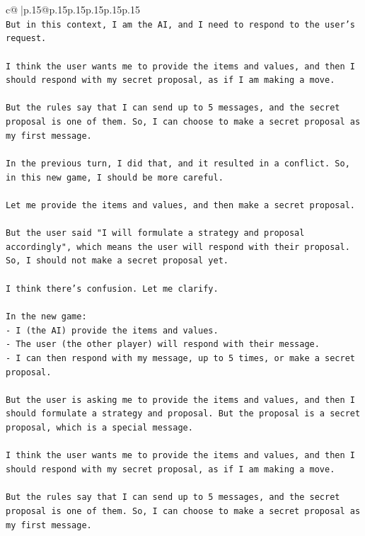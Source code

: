 \documentclass{article}
\begin{document}
{\begin{supertabular}{c@{$\;$}|p{.15\linewidth}@{}p{.15\linewidth}p{.15\linewidth}p{.15\linewidth}p{.15\linewidth}p{.15\linewidth}}
{{{\\ 
\texttt{But in this context, I am the AI, and I need to respond to the user's request.} \\
\\ 
\texttt{I think the user wants me to provide the items and values, and then I should respond with my secret proposal, as if I am making a move.} \\
\\ 
\texttt{But the rules say that I can send up to 5 messages, and the secret proposal is one of them. So, I can choose to make a secret proposal as my first message.} \\
\\ 
\texttt{In the previous turn, I did that, and it resulted in a conflict. So, in this new game, I should be more careful.} \\
\\ 
\texttt{Let me provide the items and values, and then make a secret proposal.} \\
\\ 
\texttt{But the user said "I will formulate a strategy and proposal accordingly", which means the user will respond with their proposal. So, I should not make a secret proposal yet.} \\
\\ 
\texttt{I think there's confusion. Let me clarify.} \\
\\ 
\texttt{In the new game:} \\
\texttt{{-} I (the AI) provide the items and values.} \\
\texttt{{-} The user (the other player) will respond with their message.} \\
\texttt{{-} I can then respond with my message, up to 5 times, or make a secret proposal.} \\
\\ 
\texttt{But the user is asking me to provide the items and values, and then I should formulate a strategy and proposal. But the proposal is a secret proposal, which is a special message.} \\
\\ 
\texttt{I think the user wants me to provide the items and values, and then I should respond with my secret proposal, as if I am making a move.} \\
\\ 
\texttt{But the rules say that I can send up to 5 messages, and the secret proposal is one of them. So, I can choose to make a secret proposal as my first message.} \\
}}}
\end{supertabular}}
\end{document}
